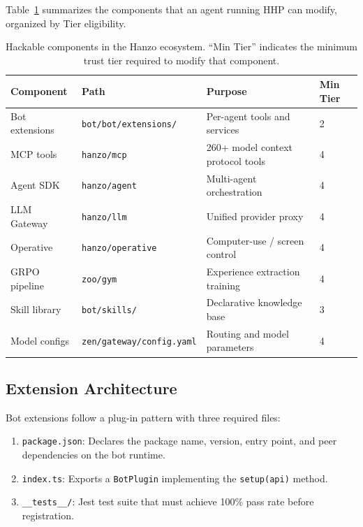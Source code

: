 \documentclass[11pt]{article}
\begin{document}
Table~\ref{tab:components} summarizes the components that an agent running HHP
can modify, organized by Tier eligibility.

\begin{table}[H]
\centering
\begin{tabularx}{\textwidth}{l l X X}
\toprule
Component & Path & Purpose & Min Tier \\
\midrule
Bot extensions & \texttt{bot/bot/extensions/} & Per-agent tools and services & 2 \\
MCP tools & \texttt{hanzo/mcp} & 260+ model context protocol tools & 4 \\
Agent SDK & \texttt{hanzo/agent} & Multi-agent orchestration & 4 \\
LLM Gateway & \texttt{hanzo/llm} & Unified provider proxy & 4 \\
Operative & \texttt{hanzo/operative} & Computer-use / screen control & 4 \\
GRPO pipeline & \texttt{zoo/gym} & Experience extraction training & 4 \\
Skill library & \texttt{bot/skills/} & Declarative knowledge base & 3 \\
Model configs & \texttt{zen/gateway/config.yaml} & Routing and model parameters & 4 \\
\bottomrule
\end{tabularx}
\caption{Hackable components in the Hanzo ecosystem. ``Min Tier'' indicates the
minimum trust tier required to modify that component.}
\label{tab:components}
\end{table}

\subsection{Extension Architecture}
\label{sec:ext-arch}

Bot extensions follow a plug-in pattern with three required files:

\begin{enumerate}[leftmargin=1.5em]
    \item \texttt{package.json}: Declares the package name, version, entry
          point, and peer dependencies on the bot runtime.
    \item \texttt{index.ts}: Exports a \texttt{BotPlugin} implementing the
          \texttt{setup(api)} method.
    \item \texttt{\_\_tests\_\_/}: Jest test suite that must achieve 100\%
          pass rate before registration.
\end{enumerate}
\end{document}
